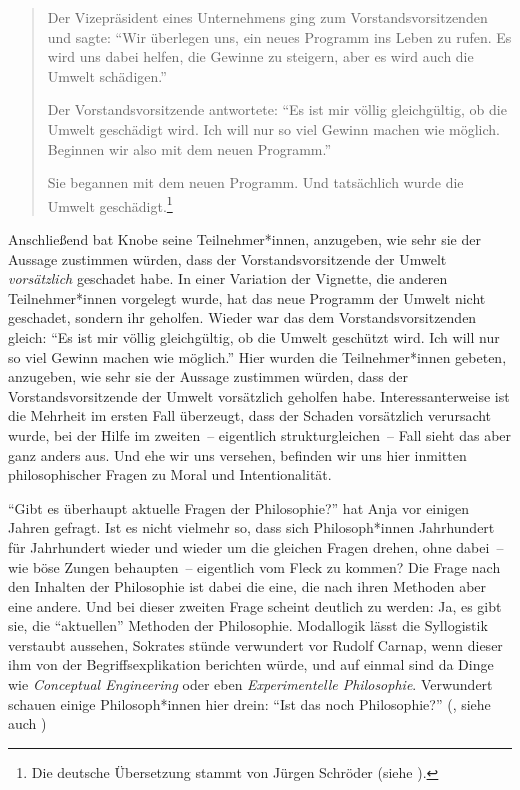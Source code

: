 \documentclass[justified,nobib,nohyper,symmetric,twoside]{tufte-book}
\begin{document}
\begin{quote}
   Der Vizepräsident eines Unternehmens ging zum Vorstandsvorsitzenden und sagte: \enquote{Wir überlegen uns, ein neues Programm ins Leben zu rufen. Es wird uns dabei helfen, die Gewinne zu steigern, aber es wird auch die Umwelt schädigen.}
   
   Der Vorstandsvorsitzende antwortete: \enquote{Es ist mir völlig gleichgültig, ob die Umwelt geschädigt wird. Ich will nur so viel Gewinn machen wie möglich. Beginnen wir also mit dem neuen Programm.}
   
   Sie begannen mit dem neuen Programm. Und tatsächlich wurde die Umwelt geschädigt.\footnote{Die deutsche Übersetzung stammt von Jürgen Schröder (siehe \citealt[S.~98]{knobe_absichtliches_2014}).}
\end{quote}

Anschließend bat Knobe seine Teilnehmer*innen, anzugeben, wie sehr sie der Aussage zustimmen würden, dass der Vorstandsvorsitzende der Umwelt \textit{vorsätzlich} geschadet habe.
In einer Variation der Vignette, die anderen Teilnehmer*innen vorgelegt wurde, hat das neue Programm der Umwelt nicht geschadet, sondern ihr geholfen.
Wieder war das dem Vorstandsvorsitzenden gleich: \enquote{Es ist mir völlig gleichgültig, ob die Umwelt geschützt wird. Ich will nur so viel Gewinn machen wie möglich.}
Hier wurden die Teilnehmer*innen gebeten, anzugeben, wie sehr sie der Aussage zustimmen würden, dass der Vorstandsvorsitzende der Umwelt vorsätzlich geholfen habe.
Interessanterweise ist die Mehrheit im ersten Fall überzeugt, dass der Schaden vorsätzlich verursacht wurde, bei der Hilfe im zweiten~-- eigentlich strukturgleichen~-- Fall sieht das aber ganz anders aus.
Und ehe wir uns versehen, befinden wir uns hier inmitten philosophischer Fragen zu Moral und Intentionalität.

\enquote{Gibt es überhaupt aktuelle Fragen der Philosophie?} hat Anja \citet{leser_aktualität_2018} vor einigen Jahren gefragt.
Ist es nicht vielmehr so, dass sich Philosoph*innen Jahrhundert für Jahrhundert wieder und wieder um die gleichen Fragen drehen, ohne dabei~-- wie böse Zungen behaupten~-- eigentlich vom Fleck zu kommen?
Die Frage nach den Inhalten der Philosophie ist dabei die eine, die nach ihren Methoden aber eine andere.
Und bei dieser zweiten Frage scheint deutlich zu werden: Ja, es gibt sie, die \enquote{aktuellen} Methoden der Philosophie.
Modallogik lässt die Syllogistik verstaubt aussehen, Sokrates stünde verwundert vor Rudolf Carnap, wenn dieser ihm von der Begriffsexplikation berichten würde, und auf einmal sind da Dinge wie \textit{Conceptual Engineering} oder eben \textit{Experimentelle Philosophie}.
Verwundert schauen einige Philosoph*innen hier drein: \enquote{Ist das noch Philosophie?} (\citealt{sorell_experimental_2018}, siehe auch \citealt{sytsma_experimental_2019})
\end{document}
